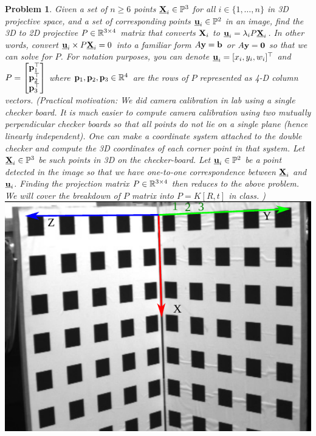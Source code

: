 \documentclass{article}
\newtheorem{prob}{Problem}
\begin{document}
\newcommand{\ubfu}{\underline{\bfu}}
\newcommand{\ubfX}{\underline{\bfX}}
\newpage
\begin{prob}
  Given a set of $n \ge 6$ points $\ubfX_i \in \bbP^3$ for all $i \in \{1,
  \dots, n\}$ in 3D projective space, and a set
  of corresponding points $\ubfu_i \in \bbP^2$ in an image, find the 3D to 2D projective
  $P \in \mathbb{R}^{3 \times 4}$ matrix
  that converts $\mathbf{X}_i$ to $\ubfu_i  =  \lambda_i P\ubfX_i$. In other words,
  convert $\ubfu_i \times P\ubfX_i = 0$ into a familiar form $A\mathbf{y} = \mathbf{b}$ or
  $A\mathbf{y} = \mathbf{0}$ so that we can solve for $P$. For notation purposes, you can
  denote $\ubfu_i = [x_i, y_i, w_i]^\top$ and $P = \begin{bmatrix}
    \mathbf{p}_1^\top \\ \mathbf{p}_2^\top \\ \mathbf{p}_3^\top \end{bmatrix}$ where $\mathbf{p}_1,
  \mathbf{p}_2, \mathbf{p}_3 \in \mathbb{R}^4$ are the rows of $P$ represented as 4-D column vectors.
  (Practical motivation:
    We did camera calibration in lab using a single checker board. It is much
    easier to compute camera calibration using two mutually perpendicular checker
    boards so that all points do not lie on a single plane (hence linearly
    independent). One can make a coordinate system attached to the double checker
    and compute the 3D coordinates of each corner point in that system. Let
    $\ubfX_i \in \bbP^3$ be such points in 3D on the checker-board. Let $\ubfu_i
    \in \bbP^2$ be a point detected in the image so that we have one-to-one
    correspondence between $\ubfX_i$ and $\ubfu_i$. Finding the projection matrix
    $P \in \mathbb{R}^{3 \times 4}$ then reduces to the above problem. We will cover
    the breakdown of $P$ matrix into $P = K[R, t]$ in class.
  ) \\
  \includegraphics[width=0.5\linewidth]{media/camera-calibration-rig.png.pdf}
\end{prob}
\newpage
\end{document}
